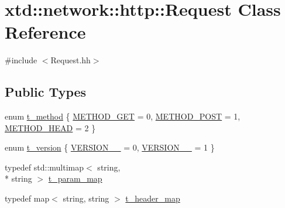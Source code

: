 \hypertarget{classxtd_1_1network_1_1http_1_1Request}{\section{xtd\-:\-:network\-:\-:http\-:\-:Request Class Reference}
\label{classxtd_1_1network_1_1http_1_1Request}
}


{\ttfamily \#include $<$Request.\-hh$>$}

\subsection*{Public Types}
\begin{DoxyCompactItemize}
\item 
enum \hyperlink{classxtd_1_1network_1_1http_1_1Request_a789d6d688af4e63cc725542fc7925627}{t\-\_\-method} \{ \hyperlink{classxtd_1_1network_1_1http_1_1Request_a789d6d688af4e63cc725542fc7925627a211feb11ea0c6defc080b91b8174ced6}{M\-E\-T\-H\-O\-D\-\_\-\-G\-E\-T} = 0, 
\hyperlink{classxtd_1_1network_1_1http_1_1Request_a789d6d688af4e63cc725542fc7925627ab832c767db7682c75bc4aa0d169b47cb}{M\-E\-T\-H\-O\-D\-\_\-\-P\-O\-S\-T} = 1, 
\hyperlink{classxtd_1_1network_1_1http_1_1Request_a789d6d688af4e63cc725542fc7925627a71ee8e01b676b10c098c9a9ccf53b414}{M\-E\-T\-H\-O\-D\-\_\-\-H\-E\-A\-D} = 2
 \}
\item 
enum \hyperlink{classxtd_1_1network_1_1http_1_1Request_ad1842a3667ff0a96222bb69262cda536}{t\-\_\-version} \{ \hyperlink{classxtd_1_1network_1_1http_1_1Request_ad1842a3667ff0a96222bb69262cda536ab4d3cfdefe25102548725517f983894f}{V\-E\-R\-S\-I\-O\-N\-\_\-\_} = 0, 
\hyperlink{classxtd_1_1network_1_1http_1_1Request_ad1842a3667ff0a96222bb69262cda536a78aeac842cfaa7d2ffe8ad53a630476d}{V\-E\-R\-S\-I\-O\-N\-\_\-\_} = 1
 \}
\item 
typedef std\-::multimap$<$ string, \\*
string $>$ \hyperlink{classxtd_1_1network_1_1http_1_1Request_a3cd6e9ac7c35897002582c4a3b84b17d}{t\-\_\-param\-\_\-map}
\item 
typedef map$<$ string, string $>$ \hyperlink{classxtd_1_1network_1_1http_1_1Request_aeaf2a69c884e81983aebaf36518c310e}{t\-\_\-header\-\_\-map}
\end{DoxyCompactItemize}
